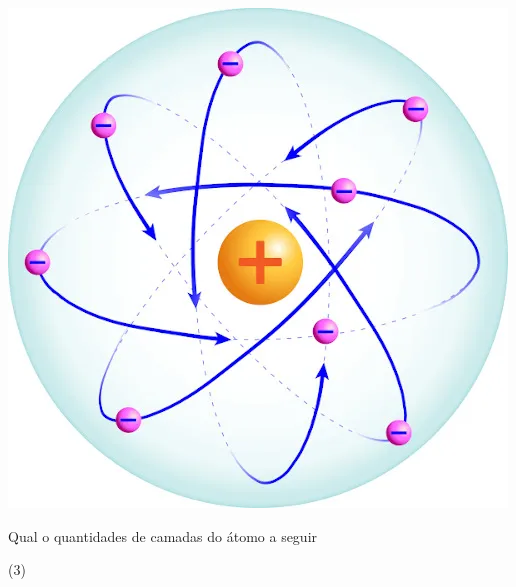 \documentclass[12pt]{scrartcl}
\begin{document}
\begin{exercise}
\begin{choice}
\choice \includegraphics[scale=.2]{Adaptadas/ruther.png}
\end{choice}
\end{exercise}


\begin{exercise}
Qual o quantidades de camadas do átomo a seguir
\begin{center}
\end{center}
\begin{choice}(3)
\end{choice}
\end{exercise}






\end{document}
